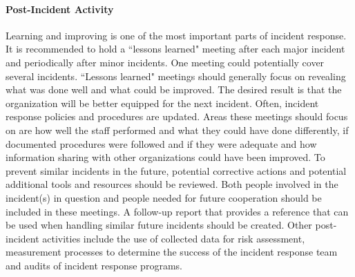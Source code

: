 \paragraph{Post-Incident Activity}
Learning and improving is one of the most important parts of incident response. It is recommended to hold a ``lessons learned" meeting after each major incident and periodically after minor incidents. One meeting could potentially cover several incidents. ``Lessons learned" meetings should generally focus on revealing what was done well and what could be improved. The desired result is that the organization will be better equipped for the next incident. Often, incident response policies and procedures are updated. Areas these meetings should focus on are how well the staff performed and what they could have done differently, if documented procedures were followed and if they were adequate and how information sharing with other organizations could have been improved. To prevent similar incidents in the future, potential corrective actions and potential additional tools and resources should be reviewed. Both people involved in the incident(s) in question and people needed for future cooperation should be included in these meetings. A follow-up report that provides a reference that can be used when handling similar future incidents should be created. Other post-incident activities include the use of collected data for risk assessment, measurement processes to determine the success of the incident response team and audits of incident response programs. 



